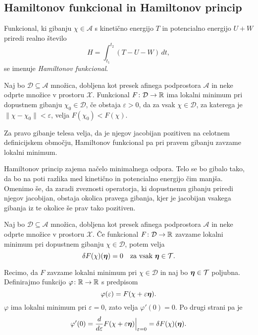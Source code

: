 \subsection{Hamiltonov funkcional in Hamiltonov princip}


\begin{definicija}
	Funkcional, ki gibanju $\chi\in \mathcal{A}$ s kinetično energijo $T$ in potencialno
	energijo $U+W$ priredi realno število
	\[
		H=\int_{t_1}^{t_2}(T-U-W)\,dt,
	\]
	se imenuje \emph{Hamiltonov funkcional}.
\end{definicija}

\begin{definicija}
	Naj bo $\mathcal{D}\subseteq\mathcal{A}$ množica, dobljena kot presek afinega podprostora $\mathcal{A}$ in
	neke odprte množice v prostoru $\mathcal{X}$.
	Funkcional $F\colon \mathcal{D}\to\mathbb R$ ima lokalni minimum pri dopustnem gibanju
	$\chi_{0}\in \mathcal{D}$, če obstaja $\varepsilon >0$,
	da za vsak $\chi\in \mathcal{D}$, za katerega je $\|\chi-\chi_{0}\|<\varepsilon$, velja $F(\chi_{0})<F(\chi)$.
\end{definicija}

\begin{hampri}
	Za pravo gibanje telesa velja, da je njegov jacobijan pozitiven na
	celotnem definicijskem območju, Hamiltonov funkcional pa pri pravem gibanju
	zavzame lokalni minimum.
\end{hampri}

Hamiltonov princip zajema načelo minimalnega odpora. Telo se bo gibalo tako, da
bo na poti razlika med kinetično in potencialno energijo čim manjša. Omenimo še, da zaradi zveznosti operatorja,
ki dopustnemu gibanju priredi njegov jacobijan, obstaja okolica pravega gibanja,
kjer je jacobijan vsakega gibanja iz te okolice še prav tako pozitiven.

\begin{trditev}
	Naj bo $\mathcal{D}\subseteq\mathcal{A}$ množica, dobljena kot presek afinega podprostora $\mathcal{A}$ in
	neke odprte množice v prostoru $\mathcal{X}$.
	Če funkcional $F\colon \mathcal{D}\to\mathbb R$ zavzame lokalni minimum pri dopustnem gibanju $\chi\in\mathcal{D}$, potem velja
	\[ \delta F(\chi)(\vek{\eta})=0\quad\textrm{za vsak}\ \vek{\eta}\in\mathcal{T}. \]
\end{trditev}

\proof
	Recimo, da $F$ zavzame lokalni minimum pri $\chi\in\mathcal{D}$ in naj bo $\boldsymbol \eta\in\mathcal{T}$ poljubna.
	Definirajmo funkcijo $\varphi\colon\mathbb R\to\mathbb R$ s predpisom
	\[ \varphi(\varepsilon)=F(\chi+\varepsilon\boldsymbol \eta). \]
	$\varphi$ ima lokalni minimum pri $\varepsilon=0$, zato velja $\varphi'(0)=0.$
	Po drugi strani pa je
	\[
		\varphi'(0)=\frac{d}{d\varepsilon}F(\chi+\varepsilon\boldsymbol \eta)\Big|_{\varepsilon=0}=
		\delta F(\chi)(\boldsymbol \eta).
	\]
\endproof

